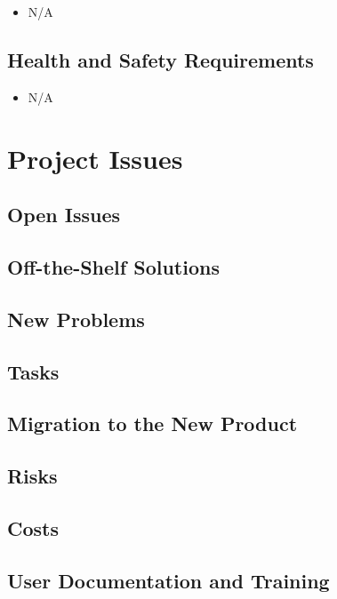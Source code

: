\documentclass[12pt, titlepage]{article}
\begin{document}
\begin{itemize}
  \item[] N/A
\end{itemize}

\subsection{Health and Safety Requirements}

\begin{itemize}
  \item[] N/A
\end{itemize}

\section{Project Issues}

\subsection{Open Issues}

\subsection{Off-the-Shelf Solutions}

\subsection{New Problems}

\subsection{Tasks}

\subsection{Migration to the New Product}

\subsection{Risks}

\subsection{Costs}

\subsection{User Documentation and Training}
\end{document}
